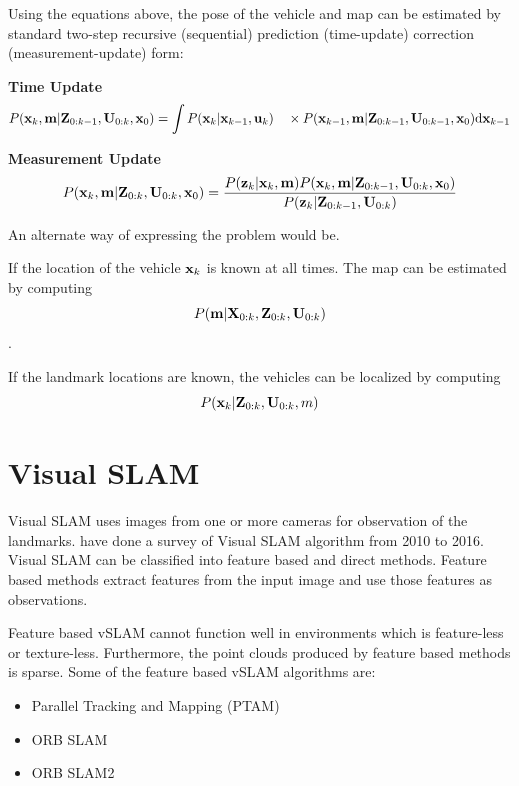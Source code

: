 Using the equations above, the pose of the vehicle and map can be estimated by standard two-step recursive (sequential) prediction (time-update) correction (measurement-update) form:

\textbf{Time Update}
\begin{equation}
P({\bf x}_{k},{\bf m}\vert {\bf Z}_{0:k-1},{\bf U}_{0:k},{\bf x}_{0})= \int P({\bf x}_{k}\vert {\bf x}_{k-1},{\bf u}_{k}) \quad\times P({\bf x}_{k-1},{\bf m}\vert {\bf Z}_{0:k-1}, {\bf U}_{0:k-1},{\bf x}_{0}){\rm d}{\bf x}_{k-1}
\end{equation}

\textbf{Measurement Update}
\begin{equation}
P({\bf x}_{k},{\bf m}\vert {\bf Z}_{0:k},{\bf U}_{0:k},{\bf x}_{0}) = {P({\bf z}_{k}\vert {\bf x}_{k},{\bf m})P({\bf x}_{k}, {\bf m}\vert {\bf Z}_{0:k-1},{\bf U}_{0:k},{\bf x}_{0})\over P({\bf z}_{k}\vert {\bf Z}_{0:k-1},{\bf U}_{0:k})}
\end{equation}

An alternate way of expressing the problem would be.

If the location of the vehicle ${\bf x}_k$ is known at all times. The map can be estimated by computing
\begin{equation}
P({\bf m}\vert {\bf X}_{0:k},{\bf Z}_{0:k}, {\bf U}_{0:k})
\end{equation}
. 

If the landmark locations are known, the vehicles can be localized by computing
\begin{equation}
P({\bf x}_k\vert {\bf Z}_{0:k},{\bf U}_{0:k}, m)
\end{equation}

\section{Visual SLAM}
Visual SLAM uses images from one or more cameras for observation of the landmarks.  have done a survey of Visual SLAM algorithm from 2010 to 2016. Visual SLAM can be classified into feature based and direct methods. Feature based methods extract features from the input image and use those features as observations.

Feature based vSLAM cannot function well in environments which is feature-less or texture-less. Furthermore, the point clouds produced by feature based methods is sparse. Some of the feature based vSLAM algorithms are:

\begin{itemize}
	\item Parallel Tracking and Mapping (PTAM) \cite{4538852}
	\item ORB SLAM \cite{7219438}
	\item ORB SLAM2 \cite{7946260}
	
\end{itemize}


